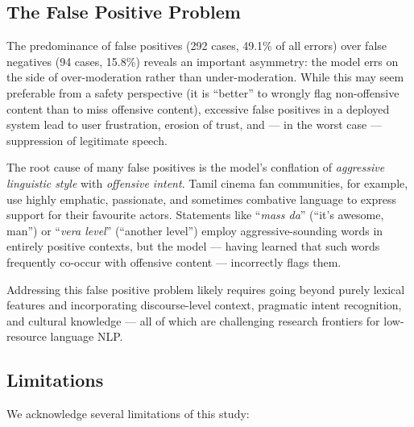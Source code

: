 \documentclass[12pt, a4paper]{article}
\begin{document}
\subsection{The False Positive Problem}

The predominance of false positives (292 cases, 49.1\% of all errors) over false negatives (94 cases, 15.8\%) reveals an important asymmetry: the model errs on the side of over-moderation rather than under-moderation. While this may seem preferable from a safety perspective (it is ``better'' to wrongly flag non-offensive content than to miss offensive content), excessive false positives in a deployed system lead to user frustration, erosion of trust, and --- in the worst case --- suppression of legitimate speech.

The root cause of many false positives is the model's conflation of \textit{aggressive linguistic style} with \textit{offensive intent}. Tamil cinema fan communities, for example, use highly emphatic, passionate, and sometimes combative language to express support for their favourite actors. Statements like ``\textit{mass da}'' (``it's awesome, man'') or ``\textit{vera level}'' (``another level'') employ aggressive-sounding words in entirely positive contexts, but the model --- having learned that such words frequently co-occur with offensive content --- incorrectly flags them.

Addressing this false positive problem likely requires going beyond purely lexical features and incorporating discourse-level context, pragmatic intent recognition, and cultural knowledge --- all of which are challenging research frontiers for low-resource language NLP.

\subsection{Limitations}

We acknowledge several limitations of this study:
\end{document}
